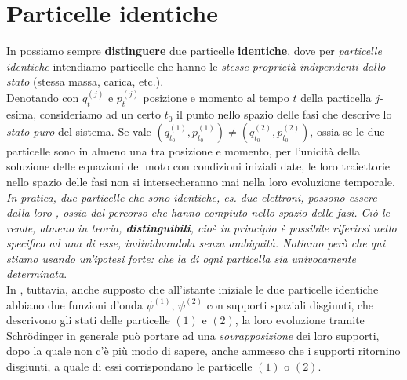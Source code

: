 \documentclass[../../FisicaTeorica.tex]{subfiles}
\begin{document}

\section{Particelle identiche}
In \MC possiamo sempre \textbf{distinguere} due particelle \textbf{identiche}, dove per \textit{particelle identiche} intendiamo particelle che hanno le \textit{stesse proprietà indipendenti dallo stato} (stessa massa, carica, etc.).\\
Denotando con $q_t^{(j)}$ e $p_t^{(j)}$ posizione e momento al tempo $t$ della particella $j$-esima, consideriamo ad un certo $t_0$ il punto nello spazio delle fasi che descrive lo \textit{stato puro} del sistema. Se vale $(q_{t_0}^{(1)}, p_{t_0}^{(1)}) \neq (q_{t_0}^{(2)},p_{t_0}^{(2)})$, ossia se le due particelle sono  in almeno una tra posizione e momento, per l'unicità della soluzione delle equazioni del moto con condizioni iniziali date, le loro traiettorie nello spazio delle fasi non si intersecheranno mai nella loro evoluzione temporale.\\
\textit{In pratica, due particelle che sono identiche, es. due elettroni, possono essere  dalla loro , ossia dal percorso che hanno compiuto nello spazio delle fasi. Ciò le rende, almeno in teoria, \textbf{distinguibili}, cioè in principio è possibile riferirsi nello specifico ad una di esse, individuandola senza ambiguità. Notiamo però che qui stiamo usando un'ipotesi forte: che la  di ogni particella sia univocamente determinata}.\\
In \MQ, tuttavia, anche supposto che all'istante iniziale le due particelle identiche abbiano due funzioni d'onda $\psi^{(1)}$, $\psi^{(2)}$ con supporti spaziali disgiunti, che descrivono gli stati delle particelle $(1)$ e $(2)$, la loro evoluzione tramite Schr\"odinger in generale può portare ad una \textit{sovrapposizione} dei loro supporti, dopo la quale non c'è più modo di sapere, anche ammesso che i supporti ritornino disgiunti, a quale di essi corrispondano le particelle $(1)$ o $(2)$.
\end{document}
